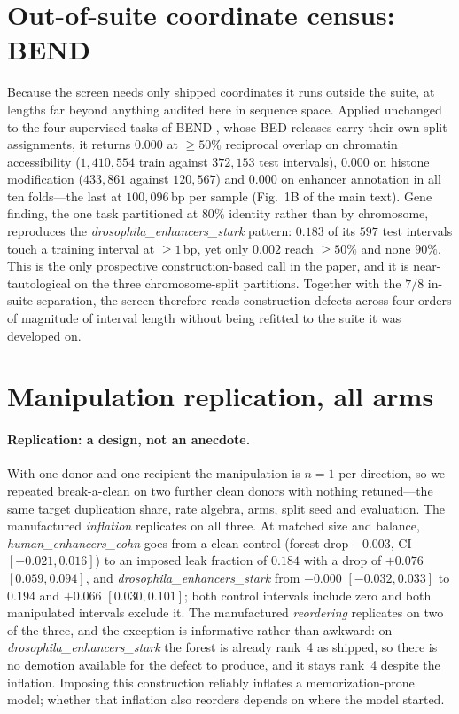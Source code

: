 \documentclass[11pt,a4paper]{article}
\begin{document}
\section{Out-of-suite coordinate census: BEND}\label{sec:s-bend}
Because the screen needs only shipped coordinates it runs outside the suite, at lengths far beyond anything audited here in sequence space. Applied unchanged to the four supervised tasks of BEND \citep{marin2024bend}, whose BED releases carry their own split assignments, it returns $0.000$ at $\ge50\%$ reciprocal overlap on chromatin accessibility ($1{,}410{,}554$ train against $372{,}153$ test intervals), $0.000$ on histone modification ($433{,}861$ against $120{,}567$) and $0.000$ on enhancer annotation in all ten folds---the last at $100{,}096$\,bp per sample (Fig.~1B of the main text). Gene finding, the one task partitioned at $80\%$ identity rather than by chromosome, reproduces the \textit{drosophila\_enhancers\_stark} pattern: $0.183$ of its $597$ test intervals touch a training interval at ${\ge}1$\,bp, yet only $0.002$ reach $\ge50\%$ and none $90\%$. This is the only prospective construction-based call in the paper, and it is near-tautological on the three chromosome-split partitions. Together with the $7/8$ in-suite separation, the screen therefore reads construction defects across four orders of magnitude of interval length without being refitted to the suite it was developed on.

\section{Manipulation replication, all arms}\label{sec:s-manipreps}
\paragraph{Replication: a design, not an anecdote.} With one donor and one recipient the manipulation is $n=1$ per direction, so we repeated break-a-clean on two further clean donors with nothing retuned---the same target duplication share, rate algebra, arms, split seed and evaluation. The manufactured \emph{inflation} replicates on all three. At matched size and balance, \textit{human\_enhancers\_cohn} goes from a clean control (forest drop $-0.003$, CI $[-0.021,0.016]$) to an imposed leak fraction of $0.184$ with a drop of $+0.076$ $[0.059,0.094]$, and \textit{drosophila\_enhancers\_stark} from $-0.000$ $[-0.032,0.033]$ to $0.194$ and $+0.066$ $[0.030,0.101]$; both control intervals include zero and both manipulated intervals exclude it. The manufactured \emph{reordering} replicates on two of the three, and the exception is informative rather than awkward: on \textit{drosophila\_enhancers\_stark} the forest is already rank~4 as shipped, so there is no demotion available for the defect to produce, and it stays rank~4 despite the inflation. Imposing this construction reliably inflates a memorization-prone model; whether that inflation also reorders depends on where the model started.
\end{document}
